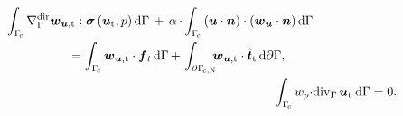 \documentclass[12pt, twoside, english]{article}
\numberwithin{equation}{section}
\newcommand{\vek}[1]{\mathchoice{\displaystyle\boldsymbol#1}
{\textstyle\boldsymbol#1}{\scriptstyle\boldsymbol#1}
{\scriptscriptstyle\boldsymbol#1}}
\newcommand{\ti}{ \ensuremath{\mathrm{t} }}
\begin{document}
\begin{align}
	\begin{split}
		\int_{\Gamma_{\!c}}\nabla_{\Gamma}^{\mathrm{dir}}\vek{w}_{\vek{u},\ti}:\vek{\sigma}\left(\vek{u}_\ti,p\right)\mathrm{d}\Gamma\,+\,\alpha\,\cdot & \int_{\Gamma_{\!c}} \left(\vek{u} \cdot \vek{n} \right) \cdot \left(\vek{w}_{\boldsymbol{u}} \cdot \vek{n} \right) \mathrm{d}\Gamma \\ =  \int_{\Gamma_{\!c}}\vek{w}_{\vek{u},\ti}\cdot\vek{f}_t\,\mathrm{d}\Gamma\,+\, & \int_{\partial\Gamma_{\!c,\mathrm{N}}}\!\!\!\vek{w}_{\vek{u},\ti}\cdot\hat{\vek{t}}_\ti\,\mathrm{d}\partial\Gamma,\label{eq:wf1srfStatStokes-mom}
	\end{split}\\
	\int_{\Gamma_{\!c}}w_{p}\cdot&\mathrm{div}_{\Gamma}\,\vek{u}_\ti\:\mathrm{d}\Gamma = 0.\label{eq:wf1srfStatStokes-cont}
\end{align}
\end{document}
